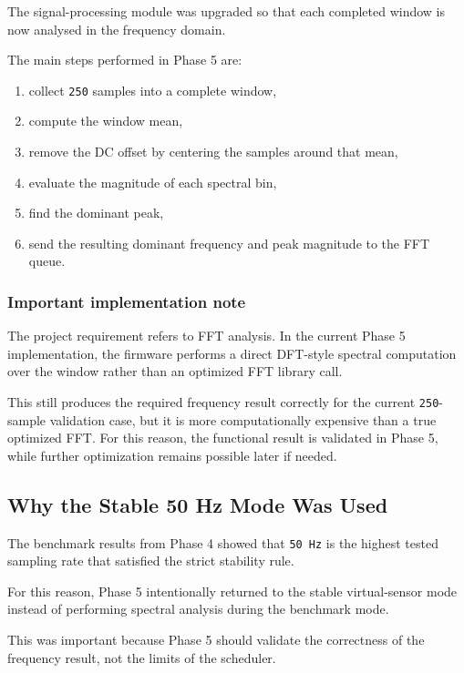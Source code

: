 \documentclass[12pt,a4paper]{article}
\begin{document}
The signal-processing module was upgraded so that each completed window is now
analysed in the frequency domain.

The main steps performed in Phase 5 are:

\begin{enumerate}[label=\arabic*.]
    \item collect \texttt{250} samples into a complete window,
    \item compute the window mean,
    \item remove the DC offset by centering the samples around that mean,
    \item evaluate the magnitude of each spectral bin,
    \item find the dominant peak,
    \item send the resulting dominant frequency and peak magnitude to the FFT
    queue.
\end{enumerate}

\subsubsection*{Important implementation note}

The project requirement refers to FFT analysis. In the current Phase 5
implementation, the firmware performs a direct DFT-style spectral computation
over the window rather than an optimized FFT library call.

This still produces the required frequency result correctly for the current
\texttt{250}-sample validation case, but it is more computationally expensive
than a true optimized FFT. For this reason, the functional result is validated
in Phase 5, while further optimization remains possible later if needed.

\subsection{Why the Stable 50 Hz Mode Was Used}

The benchmark results from Phase 4 showed that \texttt{50 Hz} is the highest
tested sampling rate that satisfied the strict stability rule.

For this reason, Phase 5 intentionally returned to the stable virtual-sensor
mode instead of performing spectral analysis during the benchmark mode.

This was important because Phase 5 should validate the correctness of the
frequency result, not the limits of the scheduler.
\end{document}

